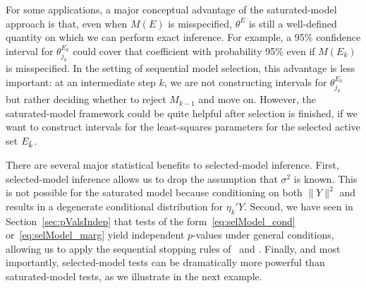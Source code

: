 \documentclass{article}
\begin{document}
For some applications, a major conceptual advantage of the saturated-model approach is that, even when $M(E)$ is misspecified, $\theta^{E}$ is still a well-defined quantity on which we can perform exact inference. For example, a 95\% confidence interval for $\theta_{j_k}^{E_k}$ could cover that coefficient with probability 95\% even if $M(E_k)$ is misspecified. In the setting of sequential model selection, this advantage is less important: at an intermediate step $k$, we are not constructing intervals for $\theta_{j_k}^{E_k}$ but rather deciding whether to reject $M_{k-1}$ and move on. However, the saturated-model framework could be quite helpful after selection is finished, if we want to construct intervals for the least-squares parameters for the selected active set $E_{\hat{k}}$.

There are several major statistical benefits to selected-model inference. First, selected-model inference allows us to drop the assumption that $\sigma^2$ is known. This is not possible for the saturated model because conditioning on both $\|Y\|^2$ and  results in a degenerate conditional distribution for $\eta_k'Y$. Second, we have seen in Section~\ref{sec:pValsIndep} that tests of the form~\eqref{eq:selModel_cond} or~\eqref{eq:selModel_marg} yield independent $p$-values under general conditions, allowing us to apply  the sequential stopping rules of~\citet{gsell2013sequential} and \citet{li2015accumulation}. Finally, and most importantly, selected-model tests can be dramatically more powerful than saturated-model tests, as we illustrate in the next example.
\end{document}
